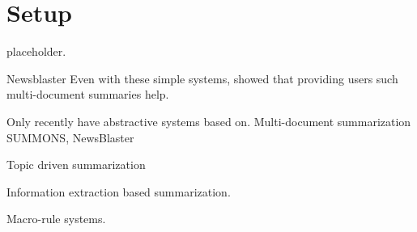\chapter{\label{chap:setup} Setup}
placeholder.

Newsblaster
Even with these simple systems, \citet{mckeown2005summaries} showed that providing users such multi-document summaries help.

Only recently have abstractive systems based on.
Multi-document summarization SUMMONS, NewsBlaster

Topic driven summarization

Information extraction based summarization.


Macro-rule systems.

